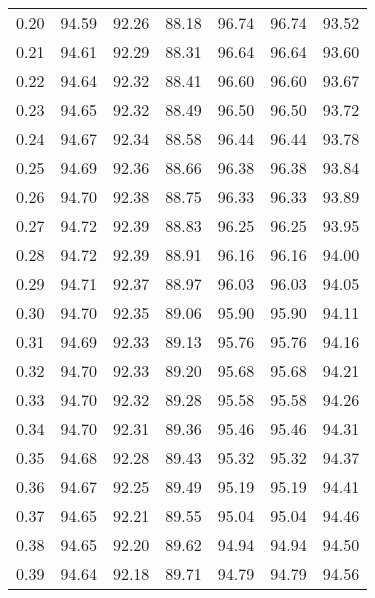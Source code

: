 \begin{tabular}{|c|c|c|c|c|c|c|}
      0.20 &     94.59 &     92.26 &      88.18 &   96.74 &      96.74 &         93.52 \\
      0.21 &     94.61 &     92.29 &      88.31 &   96.64 &      96.64 &         93.60 \\
      0.22 &     94.64 &     92.32 &      88.41 &   96.60 &      96.60 &         93.67 \\
      0.23 &     94.65 &     92.32 &      88.49 &   96.50 &      96.50 &         93.72 \\
      0.24 &     94.67 &     92.34 &      88.58 &   96.44 &      96.44 &         93.78 \\
      0.25 &     94.69 &     92.36 &      88.66 &   96.38 &      96.38 &         93.84 \\
      0.26 &     94.70 &     92.38 &      88.75 &   96.33 &      96.33 &         93.89 \\
      0.27 &     94.72 &     92.39 &      88.83 &   96.25 &      96.25 &         93.95 \\
      0.28 &     94.72 &     92.39 &      88.91 &   96.16 &      96.16 &         94.00 \\
      0.29 &     94.71 &     92.37 &      88.97 &   96.03 &      96.03 &         94.05 \\
      0.30 &     94.70 &     92.35 &      89.06 &   95.90 &      95.90 &         94.11 \\
      0.31 &     94.69 &     92.33 &      89.13 &   95.76 &      95.76 &         94.16 \\
      0.32 &     94.70 &     92.33 &      89.20 &   95.68 &      95.68 &         94.21 \\
      0.33 &     94.70 &     92.32 &      89.28 &   95.58 &      95.58 &         94.26 \\
      0.34 &     94.70 &     92.31 &      89.36 &   95.46 &      95.46 &         94.31 \\
      0.35 &     94.68 &     92.28 &      89.43 &   95.32 &      95.32 &         94.37 \\
      0.36 &     94.67 &     92.25 &      89.49 &   95.19 &      95.19 &         94.41 \\
      0.37 &     94.65 &     92.21 &      89.55 &   95.04 &      95.04 &         94.46 \\
      0.38 &     94.65 &     92.20 &      89.62 &   94.94 &      94.94 &         94.50 \\
      0.39 &     94.64 &     92.18 &      89.71 &   94.79 &      94.79 &         94.56 \\

\end{tabular}
